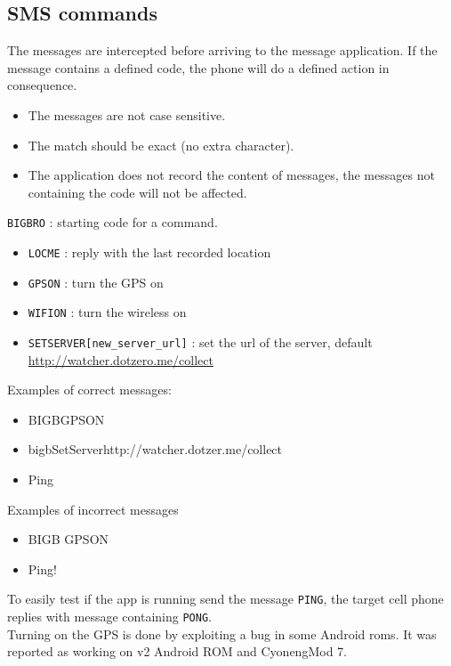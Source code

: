 \subsection{SMS commands}
\label{sec:dw-smscom}


The messages are intercepted before arriving to the message application. If the message contains a defined code, the phone will do a defined action in consequence.

\begin{itemize}
\item The messages are not case sensitive.
\item The match should be exact (no extra character).
\item The application does not record the content of messages, the messages not containing the code will not be affected.
\end{itemize}

\vspace{0.5cm}
\texttt{BIGBRO} : starting code for a command.
\begin{itemize}
\item \texttt{LOCME} : reply with the last recorded location
\item \texttt{GPSON} : turn the GPS on
\item \texttt{WIFION} : turn the wireless on
\item \texttt{SETSERVER[new\_server\_url]} : set
  the url of the server, default
  \url{http://watcher.dotzero.me/collect}
\end{itemize}

\vspace{0.5cm}
Examples of correct messages:
\begin{itemize}
\item BIGBGPSON
\item bigbSetServerhttp://watcher.dotzer.me/collect
\item Ping
\end{itemize}

\vspace{0.5cm}
Examples of incorrect messages
\begin{itemize}
\item BIGB GPSON
\item Ping!
\end{itemize}
\vspace{0.5cm}
To easily test if the app is running send the message \texttt{PING}, the target cell phone replies with message containing \texttt{PONG}.\\
Turning on the GPS is done by exploiting a bug in some Android roms. It was reported as working on v2 Android ROM and CyonengMod 7.

